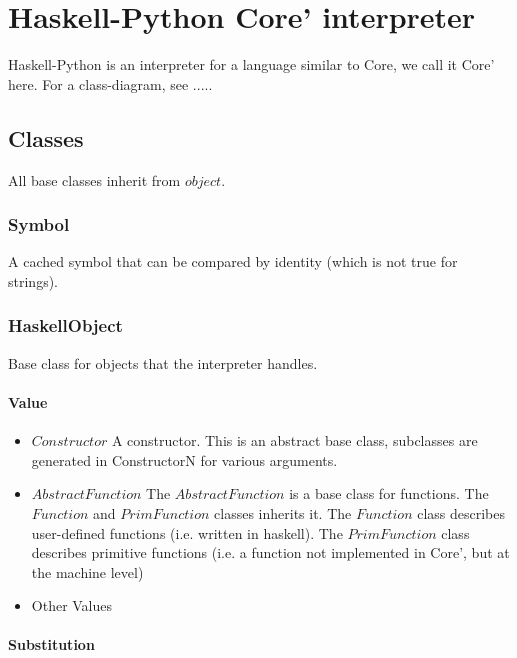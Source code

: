 



\chapter{Haskell-Python Core' interpreter}

Haskell-Python is an interpreter for a language similar to Core, we call it Core' here.
For a class-diagram, see .....

\section{Classes}

All base classes inherit from $object$.

\subsection{Symbol}

A cached symbol that can be compared by identity (which is not true for strings).

\subsection{HaskellObject}

Base class for objects that the interpreter handles.

\subsubsection{Value}

\begin{itemize}
\item{$Constructor$} A constructor. This is an abstract base class, subclasses are 
generated in ConstructorN for various arguments.
\item{$AbstractFunction$} The $AbstractFunction$ is a base class for functions. The 
$Function$ and $PrimFunction$ classes inherits it. The $Function$ class describes
user-defined functions (i.e. written in haskell). The $PrimFunction$ class describes
primitive functions (i.e. a function not implemented in Core', but at the machine level)
\item{Other Values}
\end{itemize}

\subsubsection{Substitution}

